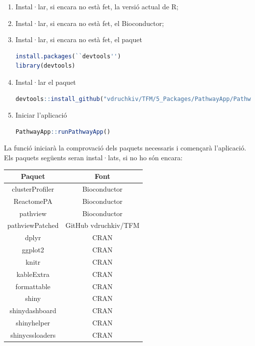 \begin{enumerate}
\item Instal·lar, si encara no està fet, la versió actual de R;

\item Instal·lar, si encara no està fet, el Bioconductor;

\item Instal·lar, si encara no està fet, el paquet 

\begin{lstlisting}[language=R]
install.packages(``devtools'')
library(devtools)
\end{lstlisting}

\item Instal·lar el paquet 

\begin{lstlisting}[language=R]
devtools::install_github("vdruchkiv/TFM/5_Packages/PathwayApp/PathwayApp")
\end{lstlisting}

\item Iniciar l'aplicació 
\begin{lstlisting}[language=R]
PathwayApp::runPathwayApp()
\end{lstlisting}
\end{enumerate}

La funció  iniciarà la comprovació dels paquets necessaris i començarà l'aplicació. Els paquets següents seran instal·lats, si no ho són encara:

\begin{center}
\begin{tabular}{||c | c ||} 
\hline\hline 
\textbf{Paquet} & \textbf{Font} \\ [0.5ex] 
\hline\hline
clusterProfiler & Bioconductor \\
\hline
ReactomePA & Bioconductor \\
\hline
pathview & Bioconductor \\ 
\hline
pathviewPatched & GitHub vdruchkiv/TFM\\
\hline
dplyr & CRAN \\
\hline 
ggplot2 & CRAN \\
\hline
knitr & CRAN \\
\hline
kableExtra & CRAN \\
\hline
formattable & CRAN \\
\hline
shiny & CRAN \\
\hline 
shinydashboard & CRAN \\ 
\hline
shinyhelper & CRAN \\
\hline 
shinycssloaders & CRAN\\
\hline\hline
\end{tabular}
\end{center}


